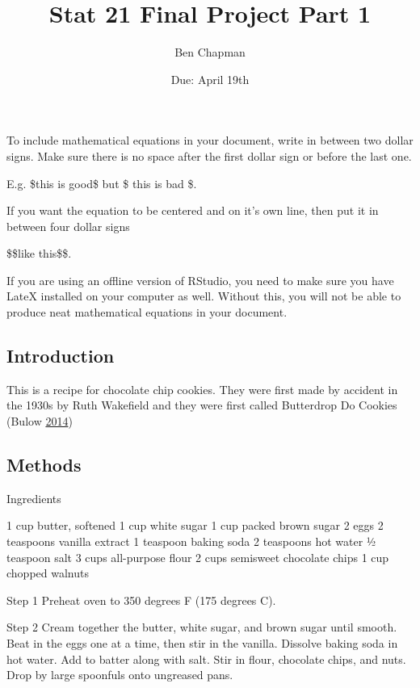 \documentclass[
]{article}
\title{Stat 21 Final Project Part 1}
\author{Ben Chapman}
\date{Due: April 19th}
\begin{document}
\maketitle

{
\setcounter{tocdepth}{2}
\tableofcontents
}
To include mathematical equations in your document, write in between two dollar signs. Make sure there is no space after the first dollar sign or before the last one.

E.g. \$this is good\$ but \$ this is bad \$.

If you want the equation to be centered and on it's own line, then put it in between four dollar signs

\begin{center}\$\$like this\$\$.\end{center}

If you are using an offline version of RStudio, you need to make sure you have LateX installed on your computer as well. Without this, you will not be able to produce neat mathematical equations in your document.

\hypertarget{introduction}{%
\subsection{Introduction}\label{introduction}}

This is a recipe for chocolate chip cookies. They were first made by accident in the 1930s by Ruth Wakefield and they were first called Butterdrop Do Cookies (Bulow \protect\hyperlink{ref-historical}{2014})

\hypertarget{methods}{%
\subsection{Methods}\label{methods}}

Ingredients

1 cup butter, softened
1 cup white sugar
1 cup packed brown sugar
2 eggs
2 teaspoons vanilla extract
1 teaspoon baking soda
2 teaspoons hot water
½ teaspoon salt
3 cups all-purpose flour
2 cups semisweet chocolate chips
1 cup chopped walnuts

Step 1
Preheat oven to 350 degrees F (175 degrees C).

Step 2
Cream together the butter, white sugar, and brown sugar until smooth. Beat in the eggs one at a time, then stir in the vanilla. Dissolve baking soda in hot water. Add to batter along with salt. Stir in flour, chocolate chips, and nuts. Drop by large spoonfuls onto ungreased pans.
\end{document}
